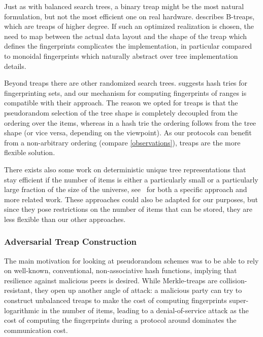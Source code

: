 Just as with balanced search trees, a binary treap might be the most natural formulation, but not the most efficient one on real hardware. \cite{golovin2009b} describes B-treaps, which are treaps of higher degree. If such an optimized realization is chosen, the need to map between the actual data layout and the shape of the treap which defines the fingerprints complicates the implementation, in particular compared to monoidal fingerprints which naturally abstract over tree implementation details.

Beyond treaps there are other randomized search trees. \cite{pugh1989incremental} suggests hash tries for fingerprinting sets, and our mechanism for computing fingerprints of ranges is compatible with their approach. The reason we opted for treaps is that the pseudorandom selection of the tree shape is completely decoupled from the ordering over the items, whereas in a hash trie the ordering follows from the tree shape (or vice versa, depending on the viewpoint). As our protocols can benefit from a non-arbitrary ordering (compare \cref{observations}), treaps are the more flexible solution.

There exists also some work on deterministic unique tree representations that stay efficient if the number of items is either a particularly small or a particularly large fraction of the size of the universe, see~\cite{sundar1994unique} for both a specific approach and more related work. These approaches could also be adapted for our purposes, but since they pose restrictions on the number of items that can be stored, they are less flexible than our other approaches.

\subsubsection{Adversarial Treap Construction}

The main motivation for looking at pseudorandom schemes was to be able to rely on well-known, conventional, non-associative hash functions, implying that resilience against malicious peers is desired. While Merkle-treaps are collision-resistant, they open up another angle of attack: a malicious party can try to construct unbalanced treaps to make the cost of computing fingerprints super-logarithmic in the number of items, leading to a denial-of-service attack as the cost of computing the fingerprints during a protocol around dominates the communication cost.

